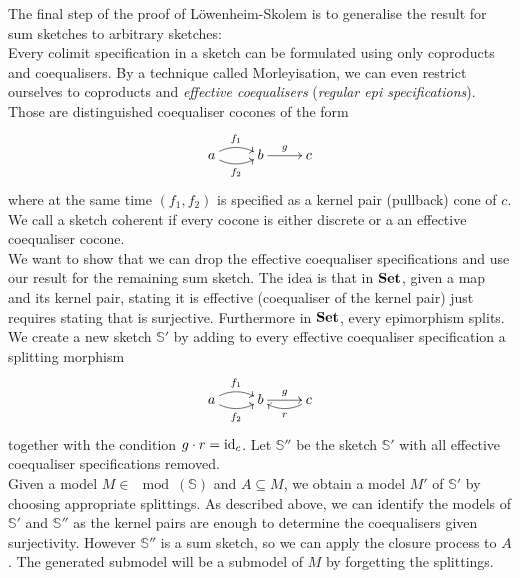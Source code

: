 The final step of the proof of Löwenheim-Skolem is to generalise the result for sum sketches to arbitrary sketches: \\

Every colimit specification in a sketch can be formulated using only coproducts and coequalisers. By a technique called Morleyisation, we can even restrict ourselves to coproducts and \emph{effective coequalisers} (\emph{regular epi specifications}). Those are distinguished coequaliser cocones of the form
\[
\xymatrix{
a \ar@/^/[r]^{f_1} \ar@/_/[r]_{f_2} & b \ar[r]^{g} & c
}\]
where at the same time $(f_1,f_2)$ is specified as a kernel pair (pullback) cone of $c$. We call a sketch coherent if every cocone is either discrete or a an effective coequaliser cocone. \\ %

We want to show that we can drop the effective coequaliser specifications and use our result for the remaining sum sketch. The idea is that in $\mathbf{Set}$, given a map and its kernel pair, stating it is effective (coequaliser of the kernel pair) just requires stating that is surjective. Furthermore in $\mathbf{Set}$, every epimorphism splits. We create a new sketch $\mathbb S'$ by adding to every effective coequaliser specification a splitting morphism
\[
\xymatrix{
a \ar@/^/[r]^{f_1} \ar@/_/[r]_{f_2} & b \ar[r]^{g} & c \ar@/^/[l]^{r}
}\]
together with the condition $g \cdot r = \textrm{id}_c$. Let $\mathbb S''$ be the sketch $\mathbb S'$ with all effective coequaliser specifications removed. \\

Given a model $M \in \mod(\mathbb S)$ and $A \subseteq M$, we obtain a model $M'$ of $\mathbb S'$ by choosing appropriate splittings. As described above, we can identify the models of $\mathbb S'$ and $\mathbb S''$ as the kernel pairs are enough to determine the coequalisers given surjectivity. However $\mathbb S''$ is a sum sketch, so we can apply the closure process to $A$. The generated submodel will be a submodel of $M$ by forgetting the splittings.